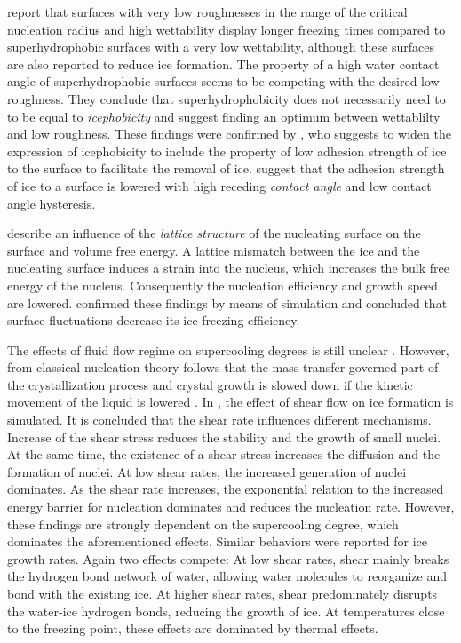 \cite{jung_are_2011} report that surfaces with very low roughnesses in the range of the critical nucleation radius and high wettability display longer freezing times compared to superhydrophobic surfaces with a very low wettability, although these surfaces are also reported to reduce ice formation. The property of a high water contact angle of superhydrophobic surfaces seems to be competing with the desired low roughness. They conclude that superhydrophobicity does not necessarily need to to be equal to \emph{icephobicity} and suggest finding an optimum between wettablilty and low roughness. 
These findings were confirmed by \cite{hejazi_superhydrophobicity_2013}, who suggests to widen the expression of icephobicity to include the property of low adhesion strength of ice to the surface to facilitate the removal of ice. \cite{janjua_performance_2017} suggest that the adhesion strength of ice to a surface is lowered with high receding \emph{contact angle} and low contact angle hysteresis.

\cite{kauffeld_handbooks_2005} describe an influence of the \emph{lattice structure} of the nucleating surface on the surface and volume free energy. A lattice mismatch between the ice and the nucleating surface induces a strain into the nucleus, which increases the bulk free energy of the nucleus. Consequently the nucleation efficiency and growth speed are lowered. \cite{qiu_ice_2017} confirmed these findings by means of simulation and concluded that surface fluctuations decrease its ice-freezing efficiency.  

The effects of fluid flow regime on supercooling degrees is still unclear \citep{kauffeld_ice_2019}. 
However, from classical nucleation theory follows that the mass transfer governed part of the crystallization process and crystal growth is slowed down if the kinetic movement of the liquid is lowered \cite{ronceray_suppression_2017, turnbull_rate_1949, kelton_nucleation_2010}.
In \cite{Luo_homogeneous_2020,Luo_ice_2019}, the effect of shear flow on ice formation is simulated. It is concluded that the shear rate influences different mechanisms. Increase of the shear stress reduces the stability  and the growth of small nuclei. At the same time, the existence of a shear stress increases the diffusion and the formation of nuclei. At low shear rates, the increased generation of nuclei dominates. As the shear rate increases, the exponential relation to the increased energy barrier for nucleation dominates and reduces the nucleation rate. However, these findings are strongly dependent on the supercooling degree, which dominates the aforementioned effects. Similar behaviors were reported for ice growth rates. Again two effects compete: At low shear rates, shear mainly breaks the hydrogen bond network of water, allowing water molecules to reorganize and bond with the existing ice. At higher shear rates, shear predominately disrupts the water-ice hydrogen bonds, reducing the growth of ice. At temperatures close to the freezing point, these effects are dominated by thermal effects.




